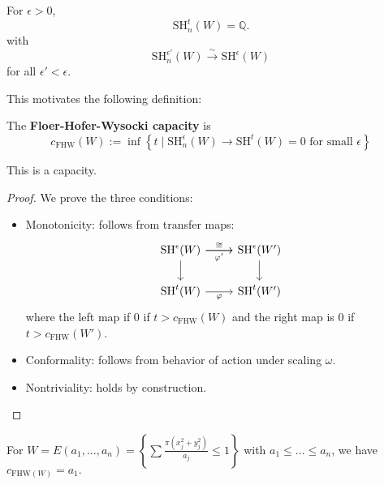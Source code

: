 \begin{proposition}

For $\epsilon>0$,
\[
\text{SH}_n^t(W)=\mathbb{Q}.
\]
with
\[
\text{SH}_n^{\epsilon'}(W) \stackrel{\sim}{\to} \text{SH}^{\epsilon}(W)
\]
for all $\epsilon'< \epsilon$.

\end{proposition}

This motivates the following definition:

\begin{definition}

The \textbf{Floer-Hofer-Wysocki capacity} is
\[
c_{\text{FHW}}(W):= \inf \left\{t\mid  \text{SH}_n^\epsilon(W) \to \text{SH}^t(W)=0 \text{ for small }\epsilon \right\}
\]

\end{definition}

\begin{theorem}

This is a capacity.

\end{theorem}

\begin{proof}
We prove the three conditions:

\begin{itemize}
\item Monotonicity: follows from transfer maps:
\[\begin{tikzcd}
		{\text{SH}^\epsilon(W)} & {\text{SH}^\epsilon(W')} \\
		{\text{SH}^t(W)} & {\text{SH}^t(W')}
		\arrow["{{\varphi'}}"', from=1-1, to=1-2]
		\arrow["\cong", from=1-1, to=1-2]
		\arrow[from=1-1, to=2-1]
		\arrow[from=1-2, to=2-2]
		\arrow["{{\varphi}}"', from=2-1, to=2-2]
	\end{tikzcd}\]
	where the left map if $0$ if $t>c_{\text{FHW}}(W)$ and the right map is $0$ if $t>c_{\text{FHW}}(W')$.
\item Conformality: follows from behavior of action under scaling $\omega$.
\item Nontriviality: holds by construction.
\end{itemize}
\end{proof}

\begin{example}

For $W= E(a_1,...,a_n) = \left\{ \sum \frac{\pi(x_j^2+y_j^2)}{a_j} \le 1\right\}$ with $a_1\le ...\le a_n$, we have $c_{\text{FHW}(W)}=a_1.$

 \end{example}